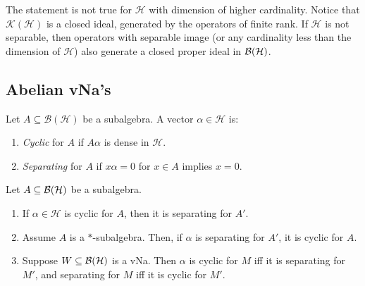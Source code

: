 \begin{remark}
  The statement is not true for $\mathcal{H}$ with dimension of higher cardinality. 
  Notice that $\mathcal{K}(\mathcal{H})$ is a closed ideal, generated by the operators of finite rank.
  If $\mathcal{H}$ is not separable, then operators with separable image (or any cardinality less than the dimension of $\mathcal{H}$) 
  also generate a closed proper ideal in $\operatorname{\mathcal{B} (\mathcal{H})}$.
\end{remark}

\subsection{Abelian vNa's}

\begin{definition}
  Let $A \subseteq \mathcal{B}(\mathcal{H})$ be a subalgebra. A vector $\alpha \in \mathcal{H}$ is:
  \begin{enumerate}
    \item \emph{Cyclic} for $A$ if $A \alpha$ is dense in $\mathcal{H}$.
    \item \emph{Separating} for $A$ if $x \alpha = 0$ for $x \in A$ implies $x = 0$.
  \end{enumerate}
\end{definition}

\begin{proposition}
  Let $A \subseteq \operatorname{\mathcal{B} (\mathcal{H})}$ be a subalgebra.
  \begin{enumerate}
    \item If $\alpha \in \mathcal{H}$ is cyclic for $A$, then it is separating for $A'$.
    \item Assume $A$ is a $*$-subalgebra. Then, if $\alpha$ is separating for $A'$, it is cyclic for $A$.
    \item Suppose $W \subseteq \operatorname{\mathcal{B} (\mathcal{H})}$ is a vNa. Then $\alpha$ is cyclic for $M$ iff it is separating for $M'$,
    and separating for $M$ iff it is cyclic for $M'$.
  \end{enumerate}
\end{proposition}

